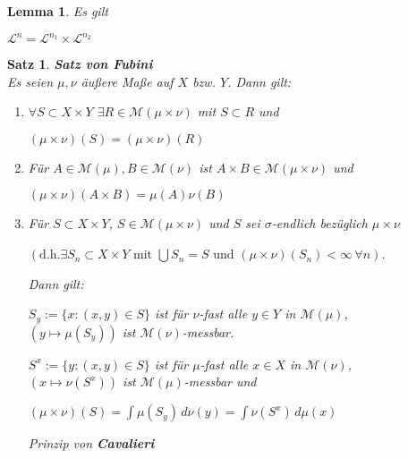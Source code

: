 \documentclass[11pt]{memoir}
\theoremstyle{changebreak}
\newtheorem{Lemma}{Lemma}[chapter]
\newtheorem{Satz}{Satz}[chapter]
\begin{document}
\begin{Lemma}
Es gilt
\begin{center}
	$\mathscr L^n = \mathscr L^{n_1} \times \mathscr L^{n_2}$
\end{center}
\end{Lemma}


\begin{Satz}
\emph{\textbf{Satz von Fubini}} \\
Es seien $\mu, \nu$ äußere Maße auf $X$ bzw. $Y$. Dann gilt:
\begin{enumerate}
	\item $\forall S \subset X \times Y$ $\exists R \in \mathscr M(\mu \times \nu)$ mit $S \subset R$ und
	\begin{center}
		$(\mu \times \nu)(S) = (\mu \times \nu)(R)$
	\end{center}
	\item Für $A \in \mathscr M(\mu), B \in \mathscr M(\nu)$ ist $A \times B \in \mathscr M(\mu \times \nu)$ und
	\begin{center}
		$(\mu \times \nu)(A \times B) = \mu(A)\nu(B)$
	\end{center}
	\item Für $S \subset X \times Y$, $S \in \mathscr M(\mu \times \nu)$ und $S$ sei $\sigma$-endlich bezüglich $\mu \times \nu$
	\par
	$\left(\text{d.h.} \exists S_n \subset X \times Y \text{ mit }\bigcup S_n = S\text{ und }(\mu \times \nu)(S_n) < \infty \,\forall n\right)$.
	\par
	Dann gilt:
	\par
	$S_y := \{x: (x, y) \in S\}$ ist für $\nu$-fast alle $y \in Y$ in $\mathscr M(\mu)$, \\
	$(y \mapsto \mu(S_y))$ ist $\mathscr M(\nu)$-messbar. \\
	\par
	$S^x := \{y : (x, y) \in S\}$ ist für $\mu$-fast alle $x \in X$ in $\mathscr M(\nu)$, \\
	$(x \mapsto \nu(S^x))$ ist $\mathscr M(\mu)$-messbar und
	\begin{center}
		$(\mu \times \nu)(S) = \int \mu(S_y)\, d\nu(y) = \int \nu(S^x) \, d\mu(x)$ \\
	\end{center}
	\emph{Prinzip von \textbf{Cavalieri}}


\end{enumerate}
\end{Satz}
\end{document}
